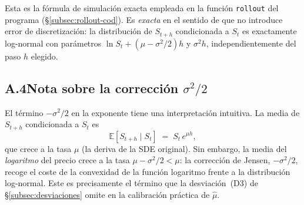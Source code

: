Esta es la fórmula de simulación exacta empleada en la función \texttt{rollout} del programa (§\ref{subsec:rollout-cod}). Es \emph{exacta} en el sentido de que no introduce error de discretización: la distribución de $S_{t+h}$ condicionada a $S_t$ es exactamente log-normal con parámetros $\ln S_t + (\mu - \sigma^2/2)h$ y $\sigma^2 h$, independientemente del paso $h$ elegido.

\subsection*{A.4\quad Nota sobre la corrección $\sigma^2/2$}

El término $-\sigma^2/2$ en la exponente tiene una interpretación intuitiva. La media de $S_{t+h}$ condicionada a $S_t$ es
\[
    \mathbb{E}[S_{t+h} \mid S_t] \;=\; S_t\, e^{\mu h},
\]
que crece a la tasa $\mu$ (la deriva de la SDE original). Sin embargo, la media del \emph{logaritmo} del precio crece a la tasa $\mu - \sigma^2/2 < \mu$: la corrección de Jensen, $-\sigma^2/2$, recoge el coste de la convexidad de la función logaritmo frente a la distribución log-normal. Este es precisamente el término que la desviación~(D3) de §\ref{subsec:desviaciones} omite en la calibración práctica de $\hat\mu$.
